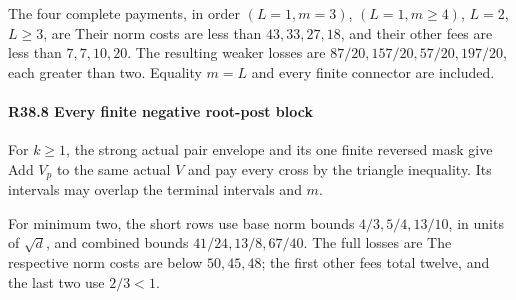 The four complete payments, in order \((L=1,\allowbreak m=3)\), \((L=1,\allowbreak m\ge4)\), \(L=2\), \(L\ge3\), are
Their norm costs are less than \(43,\allowbreak 33,\allowbreak 27,\allowbreak 18\), and their other fees are less than \(7,\allowbreak 7,\allowbreak 10,\allowbreak 20\). The resulting weaker losses are \(87/20,\allowbreak 157/20,\allowbreak 57/20,\allowbreak 197/20\), each greater than two. Equality \(m=L\) and every finite connector are included.

\paragraph{R38.8 Every finite negative root-post block}\label{part:R38.8}

For \(k\ge1\), the strong actual pair envelope and its one finite reversed mask give
Add \(V_p\) to the same actual \(V\) and pay every cross by the triangle inequality. Its intervals may overlap the terminal intervals and \(m\).

For minimum two, the short rows use base norm bounds \(4/3,\allowbreak 5/4,\allowbreak 13/10\), in units of \(\sqrt d\), and combined bounds \(41/24,\allowbreak 13/8,\allowbreak 67/40\). The full losses are
The respective norm costs are below \(50,\allowbreak 45,\allowbreak 48\); the first other fees total twelve, and the last two use \(2/3<1\).

